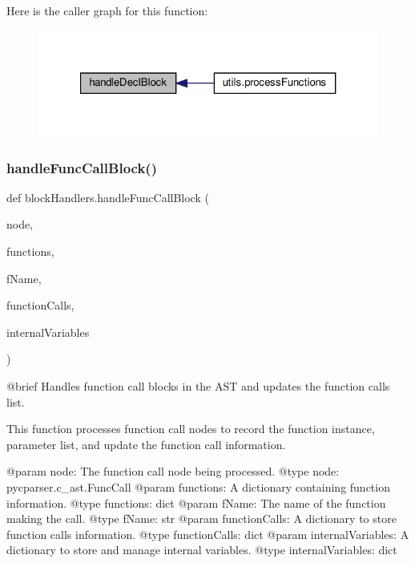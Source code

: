 Here is the caller graph for this function\+:\nopagebreak
\begin{figure}[H]
\begin{center}
\leavevmode
\includegraphics[width=321pt]{namespaceblockHandlers_ad92852be9f2eee24eb76b2dd747e7584_icgraph}
\end{center}
\end{figure}
\mbox{\label{namespaceblockHandlers_ac034bd474478ead202ae756242b4348c}} 
\subsubsection{\texorpdfstring{handle\+Func\+Call\+Block()}{handleFuncCallBlock()}}
{\footnotesize\ttfamily def block\+Handlers.\+handle\+Func\+Call\+Block (\begin{DoxyParamCaption}\item[{}]{node,  }\item[{}]{functions,  }\item[{}]{f\+Name,  }\item[{}]{function\+Calls,  }\item[{}]{internal\+Variables }\end{DoxyParamCaption})}

\begin{DoxyVerb}@brief Handles function call blocks in the AST and updates the function calls list.

This function processes function call nodes to record the function instance, parameter list, and update the function call information.

@param node: The function call node being processed.
@type node: pycparser.c_ast.FuncCall
@param functions: A dictionary containing function information.
@type functions: dict
@param fName: The name of the function making the call.
@type fName: str
@param functionCalls: A dictionary to store function calls information.
@type functionCalls: dict
@param internalVariables: A dictionary to store and manage internal variables.
@type internalVariables: dict
\end{DoxyVerb}
 

